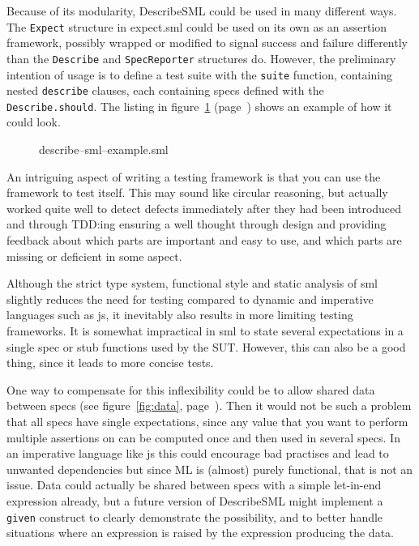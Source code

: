 \documentclass[11pt]{article}
\begin{document}
Because of its modularity, DescribeSML could be used in many different ways. The \texttt{Expect} structure in expect.sml could be used on its own as an assertion framework, possibly wrapped or modified to signal success and failure differently than the \texttt{Describe} and \texttt{SpecReporter} structures do. However, the preliminary intention of usage is to define a test suite with the \texttt{suite} function, containing nested \texttt{describe} clauses, each containing \glspl{spec} defined with the \texttt{Describe.should}. The listing in figure~\ref{lst:describesmlexample} (page~\pageref{lst:describesmlexample}) shows an example of how it could look.

\begin{figure}[ht!]

\caption{describe–sml–example.sml}
\label{lst:describesmlexample}
\end{figure}

An intriguing aspect of writing a testing framework is that you can use the framework to test itself. This may sound like circular reasoning, but actually worked quite well to detect defects immediately after they had been introduced and through TDD:ing ensuring a well thought through design and providing feedback about which parts are important and easy to use, and which parts are missing or deficient in some aspect.

Although the strict type system, functional style and static analysis of \gls{sml} slightly reduces the need for testing compared to dynamic and imperative languages such as \gls{js}, it inevitably also results in more limiting testing frameworks. It is somewhat impractical in \gls{sml} to state several expectations in a single \gls{spec} or stub functions used by the SUT. However, this can also be a good thing, since it leads to more concise tests.

One way to compensate for this inflexibility could be to allow shared data between \glspl{spec} (see figure~\ref{fig:data}, page~\pageref{fig:data}). Then it would not be such a problem that all \glspl{spec} have single expectations, since any value that you want to perform multiple assertions on can be computed once and then used in several \glspl{spec}. In an imperative language like \gls{js} this could encourage bad practises and lead to unwanted dependencies but since ML is (almost) purely functional, that is not an issue. Data could actually be shared between \glspl{spec} with a simple let-in-end expression already, but a future version of DescribeSML might implement a \texttt{given} construct to clearly demonstrate the possibility, and to better handle situations where an expression is raised by the expression producing the data.
\end{document}
